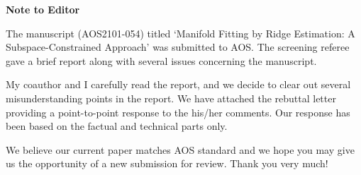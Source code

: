 \documentclass[12pt]{article}
\begin{document}


\begin{center}
	{\bf \large Note to Editor}
\end{center}
The manuscript (AOS2101-054) titled `Manifold Fitting by Ridge Estimation: A Subspace-Constrained Approach' was submitted
to AOS. The screening referee gave a brief report along with several issues concerning the manuscript. 

My coauthor and I carefully read the report, and we decide to clear out several misunderstanding points in the report. We have attached the rebuttal letter providing  a point-to-point response to the his/her comments. Our response has been based on the factual and technical parts only.



%
%
%
%
%
We believe our current paper matches AOS standard and we hope you may give us the opportunity of a new submission for review. Thank you very much!
\end{document}
